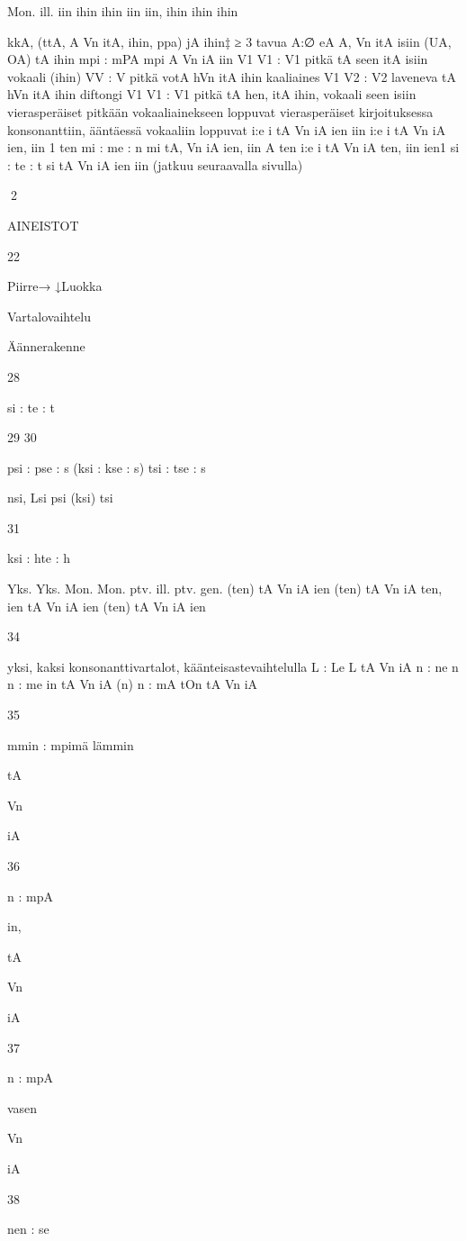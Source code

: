 \documentclass[free]{flammie}
\begin{document}
\begin{table}
Mon.
ill.
iin
ihin
ihin
iin
iin,
ihin
ihin
ihin

kkA, (ttA, A
Vn
itA,
ihin,
ppa)
jA
ihin‡
≥ 3 tavua
A:∅
eA
A,
Vn
itA
isiin
(UA, OA) tA
ihin
mpi : mPA
mpi
A
Vn
iA
iin
V1 V1 : V1
pitkä
tA
seen itA
isiin
vokaali
(ihin)
VV : V
pitkä votA
hVn itA
ihin
kaaliaines
V1 V2 : V2
laveneva
tA
hVn itA
ihin
diftongi
V1 V1 : V1
pitkä
tA
hen, itA
ihin,
vokaali
seen
isiin
vierasperäiset pitkään vokaaliainekseen loppuvat
vierasperäiset kirjoituksessa konsonanttiin, ääntäessä vokaaliin loppuvat
i:e
i
tA
Vn
iA
ien
iin
i:e
i
tA
Vn
iA
ien,
iin
1
ten
mi : me : n
mi
tA,
Vn
iA
ien,
iin
A
ten
i:e
i
tA
Vn
iA
ten,
iin
ien1
si : te : t
si
tA
Vn
iA
ien
iin
(jatkuu seuraavalla sivulla)

2

AINEISTOT

22

Piirre→
↓Luokka

Vartalovaihtelu

Äännerakenne

28

si : te : t

29
30

psi : pse : s
(ksi : kse : s)
tsi : tse : s

nsi,
Lsi
psi
(ksi)
tsi

31

ksi : hte : h

Yks. Yks. Mon. Mon.
ptv. ill.
ptv.
gen.
(ten)
tA
Vn
iA
ien
(ten)
tA
Vn
iA
ten,
ien
tA
Vn
iA
ien
(ten)
tA
Vn
iA
ien

34

yksi,
kaksi
konsonanttivartalot, käänteisastevaihtelulla
L : Le
L
tA
Vn
iA
n : ne
n
n : me
in
tA
Vn
iA
(n)
n : mA
tOn
tA
Vn
iA

35

mmin : mpimä lämmin

tA

Vn

iA

36

n : mpA

in,

tA

Vn

iA

37

n : mpA

vasen

Vn

iA

38

nen : se


\end{table}
\end{document}
